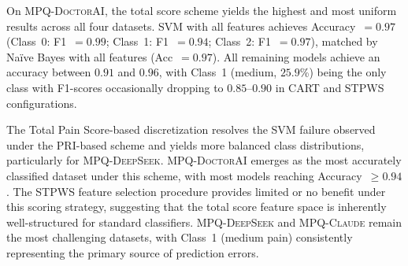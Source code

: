 \documentclass[preprint,12pt,authoryear]{elsarticle}
\newcommand{\dbClaude}{\small\textsc{MPQ-Claude}\xspace}
\newcommand{\dbDeepSeek}{\small\textsc{MPQ-DeepSeek}\xspace}
\newcommand{\dbDoctorAI}{\small\textsc{MPQ-DoctorAI}\xspace}
\begin{document}
On \dbDoctorAI, the total score scheme yields the highest and most uniform results across all four datasets. SVM with all features achieves Accuracy~$= 0.97$ (Class~0: F1~$= 0.99$; Class~1: F1~$= 0.94$; Class~2: F1~$= 0.97$), matched by Naïve Bayes with all features (Acc~$= 0.97$). All remaining models achieve an accuracy between $0.91$ and $0.96$, with Class~1 (medium, $25.9$\%) being the only class with F1-scores occasionally dropping to $0.85$--$0.90$ in CART and STPWS configurations.

The Total Pain Score-based discretization resolves the SVM failure observed under the PRI-based scheme and yields more balanced class distributions, particularly for \dbDeepSeek. \dbDoctorAI emerges as the most accurately classified dataset under this scheme, with most models reaching Accuracy~$\geq 0.94$. The STPWS feature selection procedure provides limited or no benefit under this scoring strategy, suggesting that the total score feature space is inherently well-structured for standard classifiers. \dbDeepSeek and \dbClaude remain the most challenging datasets, with Class~1 (medium pain) consistently representing the primary source of prediction errors.
\end{document}
